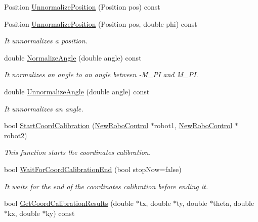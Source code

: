 \begin{DoxyCompactItemize}
Position \hyperlink{classCoordinatesCalibrer_a8522193b13196313d001c589e7845bd3}{UnnormalizePosition} (Position pos) const 
\item 
Position \hyperlink{classCoordinatesCalibrer_a19035a69d4d571e5e1d4baa4ba10baee}{UnnormalizePosition} (Position pos, double phi) const 
\begin{DoxyCompactList}\small\item\em It unnormalizes a position. \item\end{DoxyCompactList}\item 
double \hyperlink{classCoordinatesCalibrer_acae6b5f07cf198f9c85a1b09e9a275dc}{NormalizeAngle} (double angle) const 
\begin{DoxyCompactList}\small\item\em It normalizes an angle to an angle between -\/M\_\-PI and M\_\-PI. \item\end{DoxyCompactList}\item 
double \hyperlink{classCoordinatesCalibrer_ab97fd4d3f3930aaff39cee1543022cb6}{UnnormalizeAngle} (double angle) const 
\begin{DoxyCompactList}\small\item\em It unnormalizes an angle. \item\end{DoxyCompactList}\item 
bool \hyperlink{classCoordinatesCalibrer_a2087994adbb8651efcb06e3d7a2315da}{StartCoordCalibration} (\hyperlink{classNewRoboControl}{NewRoboControl} $\ast$robot1, \hyperlink{classNewRoboControl}{NewRoboControl} $\ast$robot2)
\begin{DoxyCompactList}\small\item\em This function starts the coordinates calibration. \item\end{DoxyCompactList}\item 
bool \hyperlink{classCoordinatesCalibrer_a99563ba6e43f839bf1b10f55cf155125}{WaitForCoordCalibrationEnd} (bool stopNow=false)
\begin{DoxyCompactList}\small\item\em It waits for the end of the coordinates calibration before ending it. \item\end{DoxyCompactList}\item 
bool \hyperlink{classCoordinatesCalibrer_a92672252bda26bddd9b8c73bc6395ea3}{GetCoordCalibrationResults} (double $\ast$tx, double $\ast$ty, double $\ast$theta, double $\ast$kx, double $\ast$ky) const 

\end{DoxyCompactItemize}
